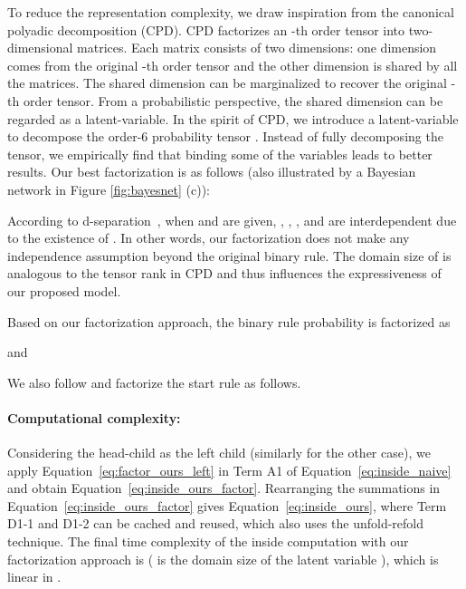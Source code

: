 \documentclass[11pt,a4paper]{article}
\begin{document}
To reduce the representation complexity, we draw inspiration from the canonical polyadic decomposition (CPD). CPD factorizes an -th order tensor into  two-dimensional matrices. Each matrix consists of two dimensions: one dimension comes from the original -th order tensor and the other dimension is shared by all the  matrices. The shared dimension can be marginalized to recover the original -th order tensor. From a probabilistic perspective, the shared dimension can be regarded as a latent-variable. In the spirit of CPD, we introduce a latent-variable  to decompose the order-6 probability tensor . Instead of fully decomposing the tensor, we empirically find that binding some of the variables leads to better results. Our best factorization is as follows (also illustrated by a Bayesian network in Figure \ref{fig:bayesnet} (c)):








According to d-separation~\citep{dseparation}, 
when  and  are given, , , , and  are interdependent due to the existence of .
In other words, our factorization does not make any independence assumption beyond the original binary rule.  The domain size of  is analogous to the tensor rank in CPD and thus influences the expressiveness of our proposed model. 


Based on our factorization approach, the binary rule probability is factorized as

and 

We also follow \citet{zhu-etal-2020-return} and factorize the start rule as follows.



\paragraph{Computational complexity:} Considering the head-child as the left child (similarly for the other case),
we apply Equation~\ref{eq:factor_ours_left} in Term A1 of Equation~\ref{eq:inside_naive} and obtain Equation~\ref{eq:inside_ours_factor}.
Rearranging the summations in Equation~\ref{eq:inside_ours_factor} gives Equation~\ref{eq:inside_ours},
where Term D1-1 and D1-2 can be cached and reused, which also uses the  unfold-refold technique. 
The final time complexity of the inside computation with our factorization approach is  ( is the domain size of the latent variable ), which is linear in .
\end{document}
